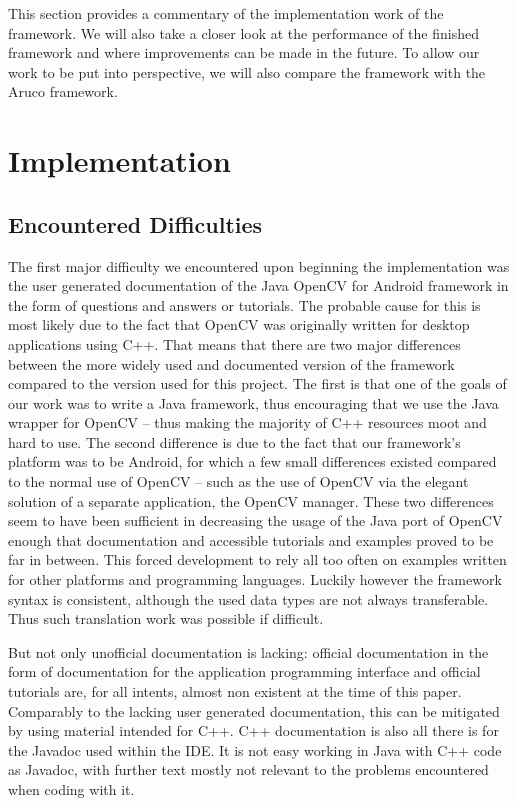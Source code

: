 This section provides a commentary of the implementation work of the framework.
We will also take a closer look at the performance of the finished framework and where improvements can be made in the future.
To allow our work to be put into perspective, we will also compare the framework with the Aruco framework.

\section{Implementation}
\label{implementation}

\subsection{Encountered Difficulties}

The first major difficulty we encountered upon beginning the implementation was the user generated documentation of the Java OpenCV for Android framework in the form of questions and answers or tutorials.
The probable cause for this is most likely due to the fact that OpenCV was originally written for desktop applications using C++.
That means that there are two major differences between the more widely used and documented version of the framework compared to the version used for this project.
The first is that one of the goals of our work was to write a Java framework, thus encouraging that we use the Java wrapper for OpenCV – thus making the majority of C++ resources moot and hard to use.
The second difference is due to the fact that our framework's platform was to be Android, for which a few small differences existed compared to the normal use of OpenCV – such as the use of OpenCV via the elegant solution of a separate application, the OpenCV manager.
These two differences seem to have been sufficient in decreasing the usage of the Java port of OpenCV enough that documentation and accessible tutorials and examples proved to be far in between.
This forced development to rely all too often on examples written for other platforms and programming languages.
Luckily however the framework syntax is consistent, although the used data types are not always transferable.
Thus such translation work was possible if difficult.

But not only unofficial documentation is lacking: official documentation in the form of documentation for the application programming interface and official tutorials are, for all intents, almost non existent at the time of this paper.
Comparably to the lacking user generated documentation, this can be mitigated by using material intended for C++.
C++ documentation is also all there is for the Javadoc used within the IDE.
It is not easy working in Java with C++ code as Javadoc, with further text mostly not relevant to the problems encountered when coding with it.

